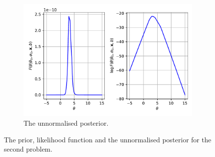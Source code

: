 \documentclass{article}
\begin{document}
\begin{figure}[htb!]
		\begin{subfigure}[b]{0.45\textwidth}
			\centering
			\includegraphics[width=\textwidth]{Q2b_3.pdf}
			\caption{The unnormalised posterior.}
		\end{subfigure}
		
		\caption{The prior, likelihood function and the unnormalised posterior for the second problem.}
		\label{fig:Q2_distributions}
	\end{figure}
\end{document}
